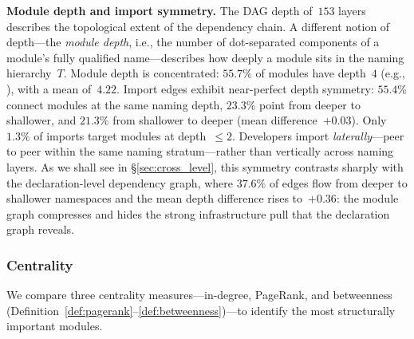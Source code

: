 \noindent\textbf{Module depth and import symmetry.}
\label{rem:import-depth-symmetry}
The DAG depth of~$153$ layers describes the topological extent of the dependency chain. A different notion of depth---the \emph{module depth}, i.e., the number of dot-separated components of a module's fully qualified name---describes how deeply a module sits in the naming hierarchy~$T$. Module depth is concentrated: $55.7\%$ of modules have depth~$4$ (e.g., ), with a mean of~$4.22$. Import edges exhibit near-perfect depth symmetry: $55.4\%$ connect modules at the same naming depth, $23.3\%$ point from deeper to shallower, and $21.3\%$ from shallower to deeper (mean difference~$+0.03$). Only~$1.3\%$ of imports target modules at depth~$\le 2$. Developers import \emph{laterally}---peer to peer within the same naming stratum---rather than vertically across naming layers. As we shall see in \S\ref{sec:cross_level}, this symmetry contrasts sharply with the declaration-level dependency graph, where $37.6\%$ of edges flow from deeper to shallower namespaces and the mean depth difference rises to~$+0.36$: the module graph compresses and hides the strong infrastructure pull that the declaration graph reveals.

\subsubsection{Centrality}
\label{sec:centrality}
\label{sec:sa-centrality}

We compare three centrality measures---in-degree, PageRank, and betweenness (Definition~\ref{def:pagerank}--\ref{def:betweenness})---to identify the most structurally important modules.

